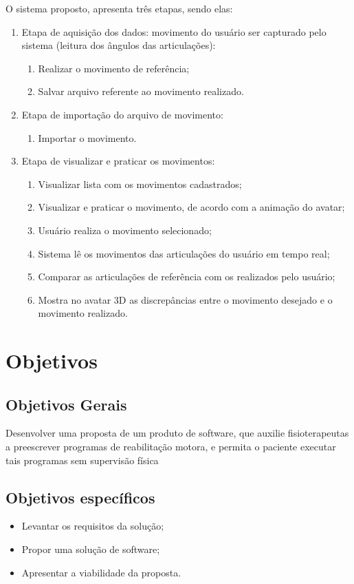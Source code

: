   O sistema proposto, apresenta três etapas, sendo elas:
  \begin{enumerate}
  \item Etapa de aquisição dos dados: movimento do usuário ser capturado pelo sistema (leitura dos ângulos das articulações):
    \begin{enumerate}
    \item Realizar o movimento de referência;
    \item Salvar arquivo referente ao movimento realizado.
    \end{enumerate}
  \item Etapa de importação do arquivo de movimento:
  \begin{enumerate}
      \item Importar o movimento.
  \end{enumerate}
  \item Etapa de visualizar e praticar os movimentos:
    \begin{enumerate}
    \item Visualizar lista com os movimentos cadastrados;
    \item Visualizar e praticar o movimento, de acordo com a animação do avatar;
    \item Usuário realiza o movimento selecionado;
    \item Sistema lê os movimentos das articulações do usuário em tempo real;
    \item Comparar as articulações de referência com os realizados pelo usuário;
    \item Mostra no avatar 3D as discrepâncias entre o movimento desejado e o movimento realizado.
    \end{enumerate}
  \end{enumerate}
\section{Objetivos}
\label{Sec:Objetivos}
\subsection{Objetivos Gerais}
\label{Sub:ObjetivosGerais}
  Desenvolver uma proposta de um produto de software,
  que auxilie fisioterapeutas a preescrever programas de reabilitação motora,
   e permita o paciente executar tais programas sem supervisão física
\subsection{Objetivos específicos}
\label{Sub:ObjetivosEspecificos}
\begin{itemize}

\item Levantar os requisitos da solução;
\item Propor uma solução de software;
\item Apresentar a viabilidade da proposta.

\end{itemize}

